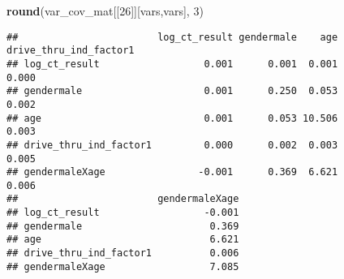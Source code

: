 \documentclass[
]{article}
\newenvironment{Shaded}{\begin{snugshade}}{\end{snugshade}}
\newcommand{\DecValTok}[1]{\textcolor[rgb]{0.00,0.00,0.81}{#1}}
\newcommand{\FunctionTok}[1]{\textcolor[rgb]{0.13,0.29,0.53}{\textbf{#1}}}
\newcommand{\NormalTok}[1]{#1}
\begin{document}
\begin{Shaded}
\begin{Highlighting}[]
\FunctionTok{round}\NormalTok{(var\_cov\_mat[[}\DecValTok{26}\NormalTok{]][vars,vars], }\DecValTok{3}\NormalTok{)}
\end{Highlighting}
\end{Shaded}

\begin{verbatim}
##                        log_ct_result gendermale    age drive_thru_ind_factor1
## log_ct_result                  0.001      0.001  0.001                  0.000
## gendermale                     0.001      0.250  0.053                  0.002
## age                            0.001      0.053 10.506                  0.003
## drive_thru_ind_factor1         0.000      0.002  0.003                  0.005
## gendermaleXage                -0.001      0.369  6.621                  0.006
##                        gendermaleXage
## log_ct_result                  -0.001
## gendermale                      0.369
## age                             6.621
## drive_thru_ind_factor1          0.006
## gendermaleXage                  7.085
\end{verbatim}
\end{document}
